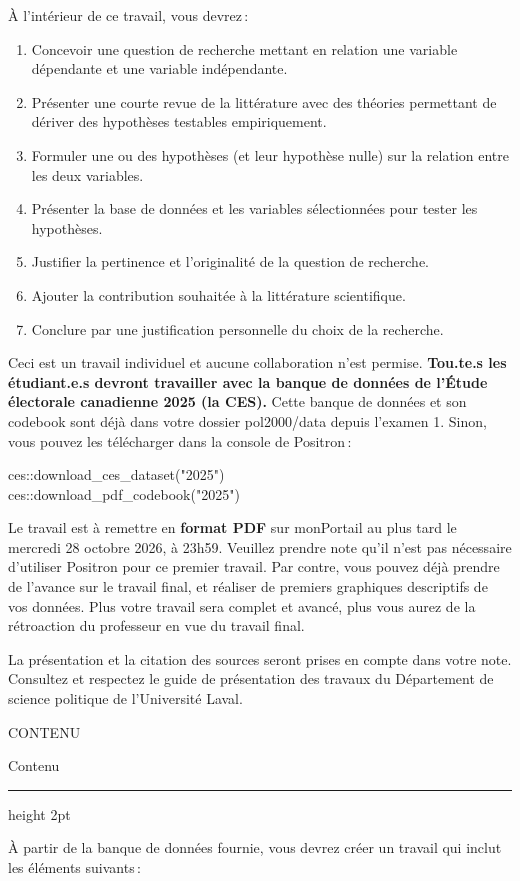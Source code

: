 \documentclass[11pt]{article}
\newcommand{\etape}[2]{%
  \par\vspace{10pt}\Needspace{4\baselineskip}%
  {\titre\small\color{rouge}#1}\par\vspace{-2pt}%
  {\titre\Large #2}\par\vspace{3pt}%
  {\color{encre}\hrule height 2pt}\vspace{6pt}}
\newcommand{\code}[1]{{\setlength{\fboxsep}{1.6pt}\colorbox{codefond}{\ttfamily\small #1}}}
\newcommand{\bloc}[1]{\begin{codebloc}#1\end{codebloc}}
\begin{document}
À l'intérieur de ce travail, vous devrez :
\begin{enumerate}
\item Concevoir une question de recherche mettant en relation une variable dépendante et une variable indépendante.
\item Présenter une courte revue de la littérature avec des théories permettant de dériver des hypothèses testables empiriquement.
\item Formuler une ou des hypothèses (et leur hypothèse nulle) sur la relation entre les deux variables.
\item Présenter la base de données et les variables sélectionnées pour tester les hypothèses.
\item Justifier la pertinence et l'originalité de la question de recherche.
\item Ajouter la contribution souhaitée à la littérature scientifique.
\item Conclure par une justification personnelle du choix de la recherche.
\end{enumerate}

Ceci est un travail individuel et aucune collaboration n'est permise. \textbf{Tou.te.s les étudiant.e.s devront travailler avec la banque de données de l'Étude électorale canadienne 2025 (la CES).} Cette banque de données et son codebook sont déjà dans votre dossier \code{pol2000/data} depuis l'examen 1. Sinon, vous pouvez les télécharger dans la console de Positron :
\bloc{ces::download\_ces\_dataset("2025")\\ces::download\_pdf\_codebook("2025")}

Le travail est à remettre en \textbf{format PDF} sur monPortail au plus tard le mercredi 28 octobre 2026, à 23h59. Veuillez prendre note qu'il n'est pas nécessaire d'utiliser Positron pour ce premier travail. Par contre, vous pouvez déjà prendre de l'avance sur le travail final, et réaliser de premiers graphiques descriptifs de vos données. Plus votre travail sera complet et avancé, plus vous aurez de la rétroaction du professeur en vue du travail final.

La présentation et la citation des sources seront prises en compte dans votre note. Consultez et respectez le guide de présentation des travaux du Département de science politique de l'Université Laval.

\etape{CONTENU}{Contenu}

À partir de la banque de données fournie, vous devrez créer un travail qui inclut les éléments suivants :
\end{document}
